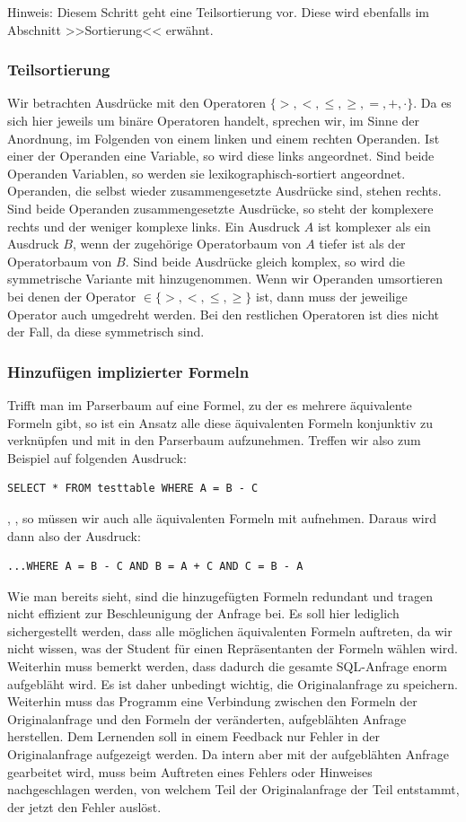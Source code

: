 Hinweis: Diesem Schritt geht eine Teilsortierung vor. Diese wird ebenfalls im Abschnitt >>Sortierung<< erwähnt. 

\subsubsection{Teilsortierung}

Wir betrachten Ausdrücke mit den Operatoren $\{>,<,\leq,\geq,=,+,\cdot\}$. Da es sich hier jeweils um binäre Operatoren handelt, sprechen wir, im Sinne der Anordnung, im Folgenden von einem linken und einem rechten Operanden. Ist einer der Operanden eine Variable, so wird diese links angeordnet. Sind beide Operanden Variablen, so werden sie lexikographisch-sortiert angeordnet. Operanden, die selbst wieder zusammengesetzte Ausdrücke sind, stehen rechts. Sind beide Operanden zusammengesetzte Ausdrücke, so steht der komplexere rechts und der weniger komplexe links. Ein Ausdruck $A$ ist komplexer als ein Ausdruck $B$, wenn der zugehörige Operatorbaum von $A$ tiefer ist als der Operatorbaum von $B$. Sind beide Ausdrücke gleich komplex, so wird die symmetrische Variante mit hinzugenommen. Wenn wir Operanden umsortieren bei denen der Operator $\in \{>,<,\leq,\geq\}$ ist, dann muss der jeweilige Operator auch umgedreht werden. Bei den restlichen Operatoren ist dies nicht der Fall, da diese symmetrisch sind.

\subsubsection{Hinzufügen implizierter Formeln}

Trifft man im Parserbaum auf eine Formel, zu der es mehrere äquivalente Formeln gibt, so ist ein Ansatz alle diese äquivalenten Formeln konjunktiv zu verknüpfen und mit in den Parserbaum aufzunehmen. Treffen wir also zum Beispiel auf folgenden Ausdruck: \begin{verbatim}SELECT * FROM testtable WHERE A = B - C\end{verbatim}, , so müssen wir auch alle äquivalenten Formeln mit aufnehmen. Daraus wird dann also der Ausdruck: \begin{verbatim}...WHERE A = B - C AND B = A + C AND C = B - A\end{verbatim}

Wie man bereits sieht, sind die hinzugefügten Formeln redundant und tragen nicht effizient zur Beschleunigung der Anfrage bei. Es soll hier lediglich sichergestellt werden, dass alle möglichen äquivalenten Formeln auftreten, da wir nicht wissen, was der Student für einen Repräsentanten der Formeln wählen wird. Weiterhin muss bemerkt werden, dass dadurch die gesamte SQL-Anfrage enorm aufgebläht wird. Es ist daher unbedingt wichtig, die Originalanfrage zu speichern. Weiterhin muss das Programm eine Verbindung zwischen den Formeln der Originalanfrage und den Formeln der veränderten, aufgeblähten Anfrage herstellen. Dem Lernenden soll in einem Feedback nur Fehler in der Originalanfrage aufgezeigt werden. Da intern aber mit der aufgeblähten Anfrage gearbeitet wird, muss beim Auftreten eines Fehlers oder Hinweises nachgeschlagen werden, von welchem Teil der Originalanfrage der Teil entstammt, der jetzt den Fehler auslöst.

